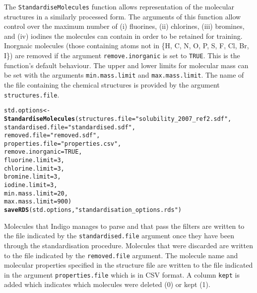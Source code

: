 \documentclass[twoside,a4wide,12pt]{article}\usepackage[]{graphicx}\usepackage[]{color}
\makeatletter
\newcommand{\hlnum}[1]{\textcolor[rgb]{0.686,0.059,0.569}{#1}}%
\newcommand{\hlstr}[1]{\textcolor[rgb]{0.192,0.494,0.8}{#1}}%
\newcommand{\hlstd}[1]{\textcolor[rgb]{0.345,0.345,0.345}{#1}}%
\newcommand{\hlkwb}[1]{\textcolor[rgb]{0.69,0.353,0.396}{#1}}%
\newcommand{\hlkwc}[1]{\textcolor[rgb]{0.333,0.667,0.333}{#1}}%
\newcommand{\hlkwd}[1]{\textcolor[rgb]{0.737,0.353,0.396}{\textbf{#1}}}%
\newenvironment{kframe}{%
 \def\at@end@of@kframe{}%
 \ifinner\ifhmode%
  \def\at@end@of@kframe{\end{minipage}}%
  \begin{minipage}{\columnwidth}%
 \fi\fi%
 \def\FrameCommand##1{\hskip\@totalleftmargin \hskip-\fboxsep
 \colorbox{shadecolor}{##1}\hskip-\fboxsep
     \hskip-\linewidth \hskip-\@totalleftmargin \hskip\columnwidth}%
 \MakeFramed {\advance\hsize-\width
   \@totalleftmargin\z@ \linewidth\hsize
   \@setminipage}}%
 {\par\unskip\endMakeFramed%
 \at@end@of@kframe}
\newenvironment{knitrout}{}{} %
\makeatother
\begin{document}
The \texttt{StandardiseMolecules} function allows representation of the molecular structures in a similarly processed form.
The arguments of this function allow control over the maximum number of (i) fluorines, (ii) chlorines,
(iii) bromines, and (iv) iodines the molecules can contain in order to be retained for training.
Inorgnaic molecules (those containing atoms not in \{H, C, N, O, P, S, F, Cl, Br, I\}) are removed if the argument \texttt{remove.inorganic} is set to \texttt{TRUE}. This is the function's default behaviour.
The upper and lower limits for molecular mass can be set with the arguments \texttt{min.mass.limit} and \texttt{max.mass.limit}.
The name of the file containing the chemical structures is provided by the argument \texttt{structures.file}.
\begin{knitrout}
\color{fgcolor}\begin{kframe}
\begin{alltt}
\hlstd{std.options} \hlkwb{<-} \hlkwd{StandardiseMolecules}\hlstd{(}\hlkwc{structures.file}\hlstd{=}\hlstr{"solubility_2007_ref2.sdf"}\hlstd{,}
                                                \hlkwc{standardised.file}\hlstd{=}\hlstr{"standardised.sdf"}\hlstd{,}
                                                \hlkwc{removed.file}\hlstd{=}\hlstr{"removed.sdf"}\hlstd{,}
                                                \hlkwc{properties.file} \hlstd{=} \hlstr{"properties.csv"}\hlstd{,}
                                                \hlkwc{remove.inorganic}\hlstd{=}\hlnum{TRUE}\hlstd{,}
                                                \hlkwc{fluorine.limit}\hlstd{=}\hlnum{3}\hlstd{,}
                                                \hlkwc{chlorine.limit}\hlstd{=}\hlnum{3}\hlstd{,}
                                                \hlkwc{bromine.limit}\hlstd{=}\hlnum{3}\hlstd{,}
                                                \hlkwc{iodine.limit}\hlstd{=}\hlnum{3}\hlstd{,}
                                                \hlkwc{min.mass.limit}\hlstd{=}\hlnum{20}\hlstd{,}
                                                \hlkwc{max.mass.limit}\hlstd{=}\hlnum{900}\hlstd{)}
\hlkwd{saveRDS}\hlstd{(std.options,} \hlstr{"standardisation_options.rds"}\hlstd{)}
\end{alltt}
\end{kframe}
\end{knitrout}
Molecules that Indigo manages to parse and that pass the filters are written to the file indicated by the \texttt{standardised.file} argument once they have been through the standardisation procedure. Molecules that were discarded are written to the file indicated by the \texttt{removed.file} argument. The molecule name and molecular properties specified in the structure file are written to the file indicated in the argument \texttt{properties.file} which is in CSV format. A column \texttt{kept} is added which indicates which molecules were deleted (0) or kept (1).
\end{document}

